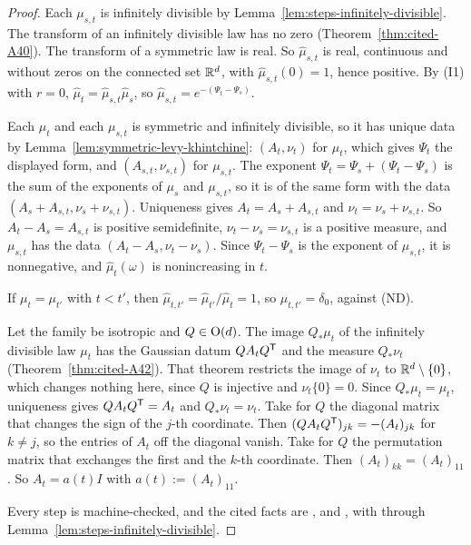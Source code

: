 \begin{proof}
Each $\mu_{s,t}$ is infinitely divisible by Lemma~\ref{lem:steps-infinitely-divisible}.
The transform of an infinitely divisible law has no zero (Theorem~\ref{thm:cited-A40}).
The transform of a symmetric law is real. So $\widehat\mu_{s,t}$ is real, continuous and without
zeros on the connected set $\mathbb{R}^d$, with $\widehat\mu_{s,t}(0) = 1$, hence positive. By (I1) with
$r = 0$, $\widehat\mu_t = \widehat\mu_{s,t}\widehat\mu_s$, so
$\widehat\mu_{s,t} = e^{-(\Psi_t - \Psi_s)}$.

Each $\mu_t$ and each $\mu_{s,t}$ is symmetric and infinitely divisible, so it has unique
\Levy{} data by Lemma~\ref{lem:symmetric-levy-khintchine}: $(A_t, \nu_t)$ for $\mu_t$, which gives
$\Psi_t$ the displayed form, and $(A_{s,t}, \nu_{s,t})$ for $\mu_{s,t}$. The exponent
$\Psi_t = \Psi_s + (\Psi_t - \Psi_s)$ is the sum of the exponents of $\mu_s$ and $\mu_{s,t}$, so it
is of the same form with the data $(A_s + A_{s,t}, \nu_s + \nu_{s,t})$. Uniqueness gives
$A_t = A_s + A_{s,t}$ and $\nu_t = \nu_s + \nu_{s,t}$. So $A_t - A_s = A_{s,t}$ is positive semidefinite,
$\nu_t - \nu_s = \nu_{s,t}$ is a positive measure, and $\mu_{s,t}$ has the data
$(A_t - A_s, \nu_t - \nu_s)$. Since $\Psi_t - \Psi_s$ is the exponent of $\mu_{s,t}$, it is
nonnegative, and $\widehat\mu_t(\omega)$ is nonincreasing in $t$.

If $\mu_t = \mu_{t'}$ with $t < t'$, then $\widehat\mu_{t,t'} = \widehat\mu_{t'}/\widehat\mu_t = 1$,
so $\mu_{t,t'} = \delta_0$, against (ND).

Let the family be isotropic and $Q \in \mathrm{O}(d)$. The image $Q_*\mu_t$ of the infinitely divisible
law $\mu_t$ has the Gaussian datum $QA_tQ^{\mathsf{T}}$ and the \Levy{} measure $Q_*\nu_t$
(Theorem~\ref{thm:cited-A42}). That theorem restricts the image of $\nu_t$ to
$\mathbb{R}^d \setminus \{0\}$, which changes nothing here, since $Q$ is injective and $\nu_t\{0\} = 0$.
Since $Q_*\mu_t = \mu_t$, uniqueness gives $QA_tQ^{\mathsf{T}} = A_t$ and $Q_*\nu_t = \nu_t$. Take for $Q$
the diagonal matrix that changes the sign of the $j$-th coordinate. Then
$(QA_tQ^{\mathsf{T}})_{jk} = -(A_t)_{jk}$ for $k \ne j$, so the entries of $A_t$ off the diagonal vanish.
Take for $Q$ the permutation matrix that exchanges the first and the $k$-th coordinate. Then
$(A_t)_{kk} = (A_t)_{11}$. So $A_t = a(t)I$ with $a(t) := (A_t)_{11}$.

Every step is machine-checked, and the cited facts are ,  and
, with  through Lemma~\ref{lem:steps-infinitely-divisible}.
\end{proof}

